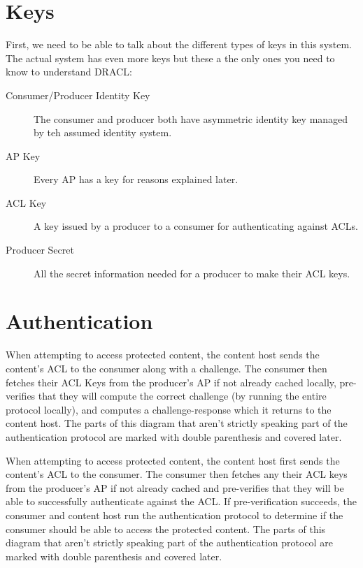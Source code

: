 \documentclass[pdftex,12pt,a4papaer,twoside,notitlepage]{report}
\begin{document}
\section{Keys}

First, we need to be able to talk about the different types of keys in this
system. The actual system has even more keys but these a the only ones you need
to know to understand DRACL:

\begin{description}
\item[Consumer/Producer Identity Key] The consumer and producer both have
  asymmetric identity key managed by teh assumed identity system.
\item[AP Key] Every AP has a key for reasons explained later.
\item[ACL Key] A key issued by a producer to a consumer for authenticating
  against ACLs.
\item[Producer Secret] All the secret information needed for a producer to make
  their ACL keys.
\end{description}

\section{Authentication}
\label{sub:authentication}

When attempting to access protected content, the content host sends the
content's ACL to the consumer along with a challenge. The consumer then fetches
their ACL Keys from the producer's AP if not already cached locally,
pre-verifies that they will compute the correct challenge (by running the entire
protocol locally), and computes a challenge-response which it returns to the
content host. The parts of this diagram that aren't strictly speaking part of
the authentication protocol are marked with double parenthesis and covered
later.

When attempting to access protected content, the content host first sends the
content's ACL to the consumer. The consumer then fetches any their ACL keys from
the producer's AP if not already cached and pre-verifies that they will be able
to successfully authenticate against the ACL. If pre-verification succeeds, the
consumer and content host run the authentication protocol to determine if the
consumer should be able to access the protected content. The parts of this
diagram that aren't strictly speaking part of the authentication protocol are
marked with double parenthesis and covered later.
\end{document}
